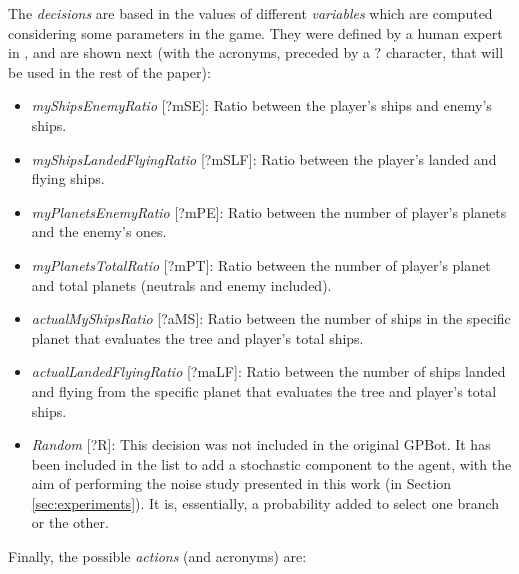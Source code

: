 \documentclass[conference]{IEEEtran}
\begin{document}
The \textit{decisions} are based in the values of different \textit{variables} which are computed considering some parameters in the game. They were defined by a human expert in \cite{GarciaGP14}, and are shown next (with the acronyms, preceded by a $?$ character, that will be used in the rest of the paper):

\begin{itemize}
\item {\em myShipsEnemyRatio} [?mSE]: Ratio between the player's ships and enemy's ships.
\item {\em myShipsLandedFlyingRatio} [?mSLF]: Ratio between the player's landed and flying ships.
\item {\em myPlanetsEnemyRatio} [?mPE]: Ratio between the number of player's planets and the enemy's ones.
\item {\em myPlanetsTotalRatio} [?mPT]: Ratio between the number of player's planet and total planets (neutrals and enemy included).
\item {\em actualMyShipsRatio} [?aMS]: Ratio between the number of ships in the specific planet that evaluates the tree and player's total ships.
\item {\em actualLandedFlyingRatio} [?maLF]: Ratio between the number of ships landed and flying from the specific planet that evaluates the tree and player's total ships.
\item {\em Random} [?R]: This decision was not included in the original GPBot. It has been included in the list to add a stochastic component to the agent, with the aim of performing the noise study presented in this work (in Section \ref{sec:experiments}). It is, essentially, a probability added to select one branch or the other.
\end{itemize}

Finally, the possible \textit{actions} (and acronyms) are:
\end{document}
